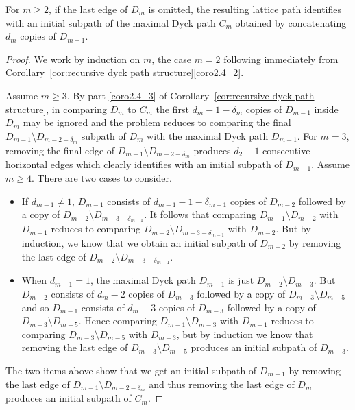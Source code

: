 \documentclass[ALCO,ThmDefs,Unicode,epreuves]{cedram}
\begin{document}
\begin{corollary}
 \label{cor:initial subpath}
 For $m\ge2$, if the last edge of $D_m$ is omitted, the resulting lattice path identifies with an initial subpath of the maximal Dyck path $C_m$ obtained by concatenating $d_m$ copies of $D_{m-1}$.
\end{corollary}
\begin{proof}
 We work by induction on $m$, the case $m=2$ following immediately from Corollary~\ref{cor:recursive dyck path structure}\ref{coro2.4_2}. 

 Assume $m\ge3$.
 By part \ref{coro2.4_3} of Corollary~\ref{cor:recursive dyck path structure}, in comparing $D_m$ to $C_m$ the first $d_m-1-\delta_m$ copies of $D_{m-1}$ inside $D_m$ may be ignored and the problem reduces to comparing the final $D_{m-1}\setminus D_{m-2-\delta_m}$ subpath of $D_m$ with the maximal Dyck path $D_{m-1}$.
 For $m=3$, removing the final edge of $D_{m-1}\setminus D_{m-2-\delta_m}$ produces $d_2-1$ consecutive horizontal edges which clearly identifies with an initial subpath of $D_{m-1}$.
 Assume $m\ge4$.
 There are two cases to consider.
 \begin{itemize}
 \item If $d_{m-1}\ne1$, $D_{m-1}$ consists of $d_{m-1}-1-\delta_{m-1}$ copies of $D_{m-2}$ followed by a copy of $D_{m-2}\setminus D_{m-3-\delta_{m-1}}$. 
 It follows that comparing $D_{m-1}\setminus D_{m-2}$ with $D_{m-1}$ reduces to comparing $D_{m-2}\setminus D_{m-3-\delta_{m-1}}$ with $D_{m-2}$.
 But by induction, we know that we obtain an initial subpath of $D_{m-2}$ by removing the last edge of $D_{m-2}\setminus D_{m-3-\delta_{m-1}}$.
 \item When $d_{m-1}=1$, the maximal Dyck path $D_{m-1}$ is just $D_{m-2}\setminus D_{m-3}$. 
 But $D_{m-2}$ consists of $d_m-2$ copies of $D_{m-3}$ followed by a copy of $D_{m-3}\setminus D_{m-5}$ and so $D_{m-1}$ consists of $d_m-3$ copies of $D_{m-3}$ followed by a copy of $D_{m-3}\setminus D_{m-5}$. 
 Hence comparing $D_{m-1}\setminus D_{m-3}$ with $D_{m-1}$ reduces to comparing $D_{m-3}\setminus D_{m-5}$ with $D_{m-3}$, but by induction we know that removing the last edge of $D_{m-3}\setminus D_{m-5}$ produces an initial subpath of $D_{m-3}$.
 \end{itemize}
 The two items above show that we get an initial subpath of $D_{m-1}$ by removing the last edge of $D_{m-1}\setminus D_{m-2-\delta_m}$ and thus removing the last edge of $D_m$ produces an initial subpath of $C_m$. 
\end{proof}
\end{document}
